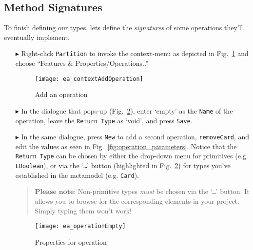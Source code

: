 \newpage
\subsection{Method Signatures}
\visHeader
\hypertarget{static:methods vis}{}

To finish defining our types, lets define the \emph{signatures} of some operations they'll eventually implement.

\begin{enumerate}
  
\item[$\blacktriangleright$] Right-click \texttt{Partition} to invoke the context-menu as depicted in Fig.~\ref{fig:add_operation} and choose ``Features \&
Properties/Operations..''

\begin{figure}[htbp]
	\centering
  \texttt{[image: ea\_contextAddOperation]}
	\caption{Add an operation}
	\label{fig:add_operation}
\end{figure}
\FloatBarrier

\item[$\blacktriangleright$] In the dialogue that pops-up (Fig.~\ref{fig:operation_properties}), enter `empty' as the \texttt{Name} of the operation,
leave the \texttt{Return Type} as `void', and press \texttt{Save}. 

\vspace{0.5cm}

\item[$\blacktriangleright$] In the same dialogue, press \texttt{New} to add a second operation, \texttt{removeCard}, and edit the values as seen in 
Fig.~\ref{fig:operation_parameters}. Notice that the \texttt{Return Type} can be chosen by either the drop-down menu for
primitives (e.g. \texttt{EBoolean}), or via the `\texttt{\ldots}' button (highlighted in Fig.~\ref{fig:operation_properties}) for types you've established in
the metamodel (e.g. \texttt{Card}).
\vspace{-.3cm}
\begin{quote}
{ \small
$\textbf{Please note:}$ Non-primitive types \emph{must} be chosen via the `\texttt{\ldots}' button. It allows you to browse for the corresponding elements in
your project. Simply typing them won't work!
}
\end{quote}

\begin{figure}[htbp]
	\centering
  	\texttt{[image: ea\_operationEmpty]}
	\caption{Properties for operation}
	\label{fig:operation_properties}
\end{figure}


\end{enumerate}
